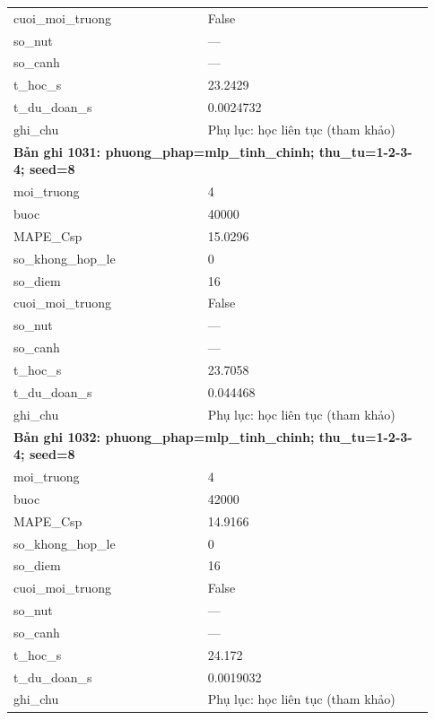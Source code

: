 \begin{longtable}{p{0.43\linewidth}p{0.50\linewidth}}
cuoi\_\allowbreak moi\_\allowbreak truong & False \\
so\_\allowbreak nut & — \\
so\_\allowbreak canh & — \\
t\_\allowbreak hoc\_\allowbreak s & 23.2429 \\
t\_\allowbreak du\_\allowbreak doan\_\allowbreak s & 0.0024732 \\
ghi\_\allowbreak chu & Phụ lục: học liên tục (tham khảo) \\
\midrule
\multicolumn{2}{p{0.95\linewidth}}{\textbf{Bản ghi 1031: phuong\_phap=mlp\_tinh\_chinh; thu\_tu=1-2-3-4; seed=8}} \\
moi\_\allowbreak truong & 4 \\
buoc & 40000 \\
MAPE\_\allowbreak Csp & 15.0296 \\
so\_\allowbreak khong\_\allowbreak hop\_\allowbreak le & 0 \\
so\_\allowbreak diem & 16 \\
cuoi\_\allowbreak moi\_\allowbreak truong & False \\
so\_\allowbreak nut & — \\
so\_\allowbreak canh & — \\
t\_\allowbreak hoc\_\allowbreak s & 23.7058 \\
t\_\allowbreak du\_\allowbreak doan\_\allowbreak s & 0.044468 \\
ghi\_\allowbreak chu & Phụ lục: học liên tục (tham khảo) \\
\midrule
\multicolumn{2}{p{0.95\linewidth}}{\textbf{Bản ghi 1032: phuong\_phap=mlp\_tinh\_chinh; thu\_tu=1-2-3-4; seed=8}} \\
moi\_\allowbreak truong & 4 \\
buoc & 42000 \\
MAPE\_\allowbreak Csp & 14.9166 \\
so\_\allowbreak khong\_\allowbreak hop\_\allowbreak le & 0 \\
so\_\allowbreak diem & 16 \\
cuoi\_\allowbreak moi\_\allowbreak truong & False \\
so\_\allowbreak nut & — \\
so\_\allowbreak canh & — \\
t\_\allowbreak hoc\_\allowbreak s & 24.172 \\
t\_\allowbreak du\_\allowbreak doan\_\allowbreak s & 0.0019032 \\
ghi\_\allowbreak chu & Phụ lục: học liên tục (tham khảo) \\

\end{longtable}
